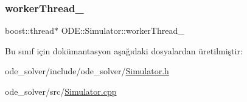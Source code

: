\subsubsection{\texorpdfstring{workerThread\_}{workerThread\_}}
{\footnotesize\ttfamily boost\+::thread$\ast$ O\+D\+E\+::\+Simulator\+::worker\+Thread\+\_\+\hspace{0.3cm}{\ttfamily [protected]}}



Bu sınıf için dokümantasyon aşağıdaki dosyalardan üretilmiştir\+:\begin{DoxyCompactItemize}
\item 
ode\+\_\+solver/include/ode\+\_\+solver/\mbox{\hyperlink{Simulator_8h}{Simulator.\+h}}\item 
ode\+\_\+solver/src/\mbox{\hyperlink{Simulator_8cpp}{Simulator.\+cpp}}\end{DoxyCompactItemize}
